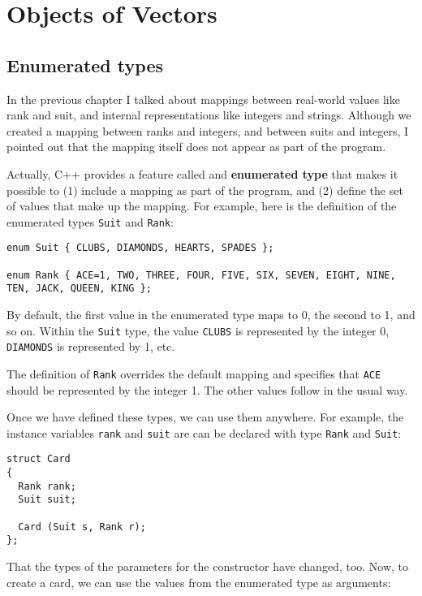 

\chapter{Objects of Vectors}

\section{Enumerated types}

In the previous chapter I talked about mappings between
real-world values like rank and suit, and internal representations
like integers and strings.  Although we created a mapping between
ranks and integers, and between suits and integers, I pointed
out that the mapping itself does not appear as part of the
program.

Actually, C++ provides a feature called and {\bf enumerated type}
that makes it possible to (1) include a mapping as part of the
program, and (2) define the set of values that make up the
mapping.  For example, here is the definition
of the enumerated types {\tt Suit} and {\tt Rank}:

\begin{verbatim}
enum Suit { CLUBS, DIAMONDS, HEARTS, SPADES };

enum Rank { ACE=1, TWO, THREE, FOUR, FIVE, SIX, SEVEN, EIGHT, NINE,
TEN, JACK, QUEEN, KING };
\end{verbatim}
%
By default, the first value in the enumerated type maps to
0, the second to 1, and so on.  Within the {\tt Suit} type, the value
{\tt CLUBS} is represented by the integer 0, {\tt DIAMONDS} is
represented by 1, etc.

The definition of {\tt Rank} overrides the default mapping and
specifies that {\tt ACE} should be represented by the integer 1.
The other values follow in the usual way.

Once we have defined these types, we can use them anywhere.  For
example, the instance variables {\tt rank} and {\tt suit} are
can be declared with type {\tt Rank} and {\tt Suit}:

\begin{verbatim}
struct Card
{
  Rank rank;
  Suit suit;

  Card (Suit s, Rank r);
};
\end{verbatim}
%
That the types of the parameters for the constructor
have changed, too.  Now, to create a card, we can use the values from
the enumerated type as arguments:

